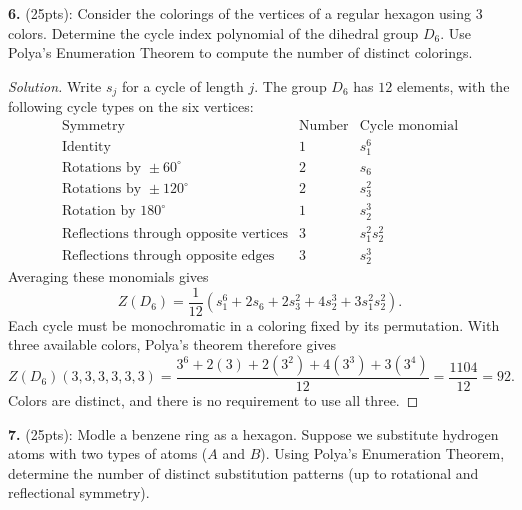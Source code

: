 \documentclass[12pt]{amsart}
\newenvironment{solution}
{\begin{proof}[Solution]}
{\end{proof}}
\begin{document}
\begin{onehalfspace}
        \noindent\textbf{6.} (25pts): Consider the colorings of the vertices of a regular hexagon using
        3 colors.
        Determine the cycle index polynomial of the dihedral group $D_6$.
        Use Polya's Enumeration Theorem to compute the number of distinct colorings.

        \begin{solution}
            Write $s_j$ for a cycle of length $j$.  The group $D_6$ has
            $12$ elements, with the following cycle types on the six vertices:
            \[
                \begin{array}{c|c|c}
                    \text{Symmetry}&\text{Number}&\text{Cycle monomial}\\ \hline
                    \text{Identity}&1&s_1^6\\
                    \text{Rotations by }\pm60^\circ&2&s_6\\
                    \text{Rotations by }\pm120^\circ&2&s_3^2\\
                    \text{Rotation by }180^\circ&1&s_2^3\\
                    \text{Reflections through opposite vertices}&3&s_1^2s_2^2\\
                    \text{Reflections through opposite edges}&3&s_2^3
                \end{array}
            \]
            Averaging these monomials gives
            \[
                Z(D_6)=\frac1{12}
                    (s_1^6+2s_6+2s_3^2+4s_2^3+3s_1^2s_2^2).
            \]
            Each cycle must be monochromatic in a coloring fixed by its
            permutation.  With three available colors, Polya's theorem
            therefore gives
            \[
                Z(D_6)(3,3,3,3,3,3)
                =\frac{3^6+2(3)+2(3^2)+4(3^3)+3(3^4)}{12}
                =\frac{1104}{12}=\boxed{92}.
            \]
            Colors are distinct, and there is no requirement to use all three.
        \end{solution}

        \noindent\textbf{7.} (25pts): Modle a benzene ring as a hexagon.
        Suppose we substitute hydrogen atoms with two types of atoms ($A$ and $B$).
        Using Polya's Enumeration Theorem, determine the number of distinct substitution patterns
        (up to rotational and reflectional symmetry).


\end{onehalfspace}
\end{document}
